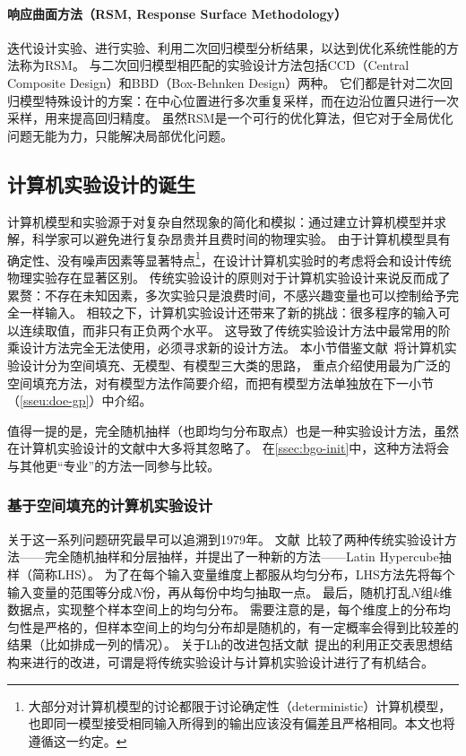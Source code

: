 \documentclass[index]{subfiles}
\begin{document}
\paragraph{响应曲面方法（RSM, Response Surface Methodology）}
迭代设计实验、进行实验、利用二次回归模型分析结果，以达到优化系统性能的方法称为RSM。
与二次回归模型相匹配的实验设计方法包括CCD（Central Composite Design）和BBD（Box-Behnken Design）两种。
它们都是针对二次回归模型特殊设计的方案：在中心位置进行多次重复采样，而在边沿位置只进行一次采样，用来提高回归精度\cite{montgomery}。
虽然RSM是一个可行的优化算法，但它对于全局优化问题无能为力，只能解决局部优化问题。

\subsection{计算机实验设计的诞生}
计算机模型和实验源于对复杂自然现象的简化和模拟：通过建立计算机模型并求解，科学家可以避免进行复杂昂贵并且费时间的物理实验。
由于计算机模型具有确定性、没有噪声因素等显著特点\footnote{大部分对计算机模型的讨论都限于讨论确定性（deterministic）计算机模型，也即同一模型接受相同输入所得到的输出应该没有偏差且严格相同。本文也将遵循这一约定。}，在设计计算机实验时的考虑将会和设计传统物理实验存在显著区别\cite{sacks1989}。
传统实验设计的原则对于计算机实验设计来说反而成了累赘：不存在未知因素，多次实验只是浪费时间，不感兴趣变量也可以控制给予完全一样输入。
相较之下，计算机实验设计还带来了新的挑战：很多程序的输入可以连续取值，而非只有正负两个水平。
这导致了传统实验设计方法中最常用的阶乘设计方法完全无法使用，必须寻求新的设计方法。
本小节借鉴文献~将计算机实验设计分为空间填充、无模型、有模型三大类的思路，
重点介绍使用最为广泛的空间填充方法，对有模型方法作简要介绍，而把有模型方法单独放在下一小节（\cref{sseu:doe-gp}）中介绍。

值得一提的是，完全随机抽样（也即均匀分布取点）也是一种实验设计方法，虽然在计算机实验设计的文献中大多将其忽略了。
在\cref{ssec:bgo-init}中，这种方法将会与其他更“专业”的方法一同参与比较。

\subsubsection{基于空间填充的计算机实验设计}
关于这一系列问题研究最早可以追溯到1979年。
文献~比较了两种传统实验设计方法——完全随机抽样和分层抽样，并提出了一种新的方法——Latin Hypercube抽样（简称LHS）。
为了在每个输入变量维度上都服从均匀分布，LHS方法先将每个输入变量的范围等分成$N$份，再从每份中均匀抽取一点。
最后，随机打乱$N$组$k$维数据点，实现整个样本空间上的均匀分布。
需要注意的是，每个维度上的分布均匀性是严格的，但样本空间上的均匀分布却是随机的，有一定概率会得到比较差的结果（比如排成一列的情况\cite{pronzato2012}）。
关于Lh的改进包括文献~提出的利用正交表思想结构来进行的改进，可谓是将传统实验设计与计算机实验设计进行了有机结合。
\end{document}
